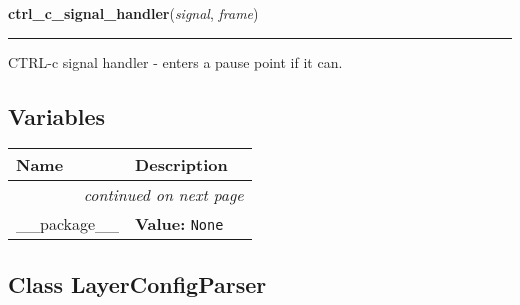     \vspace{0.5ex}

\hspace{.8\funcindent}\begin{boxedminipage}{\funcwidth}

    \raggedright \textbf{ctrl\_c\_signal\_handler}(\textit{signal}, \textit{frame})

    \vspace{-1.5ex}

    \rule{\textwidth}{0.5\fboxrule}
\setlength{\parskip}{2ex}
    CTRL-c signal handler - enters a pause point if it can.

\setlength{\parskip}{1ex}
    \end{boxedminipage}



  \subsection{Variables}

    \vspace{-1cm}
\hspace{\varindent}\begin{longtable}{|p{\varnamewidth}|p{\vardescrwidth}|l}
\cline{1-2}
\cline{1-2} \centering \textbf{Name} & \centering \textbf{Description}& \\
\cline{1-2}
\endhead\cline{1-2}\multicolumn{3}{r}{\small\textit{continued on next page}}\\\endfoot\cline{1-2}
\endlastfoot\raggedright \_\-\_\-p\-a\-c\-k\-a\-g\-e\-\_\-\_\- & \raggedright \textbf{Value:} 
{\tt None}&\\
\cline{1-2}
\end{longtable}



\subsection{Class LayerConfigParser}

